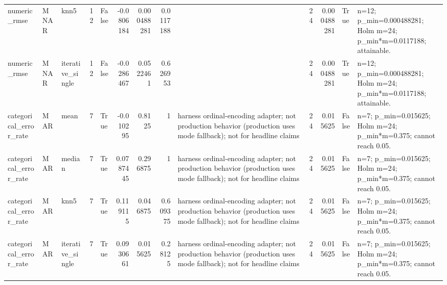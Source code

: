 \begin{table}[ht]
\begin{tabular}{lllrlrrrlrrll}
 numeric\_rmse           & MNAR        & knn5             &           12 & False               &      -0.0806184  & 0.000488281 & 0.0117188 &                                                                                                                    &                             24 &                        0.000488281 & True                        & n=12; p\_min=0.000488281; Holm m=24; p\_min*m=0.0117188; attainable. \\
 numeric\_rmse           & MNAR        & iterative\_single &           12 & False               &      -0.0286467  & 0.0522461   & 0.626953  &                                                                                                                    &                             24 &                        0.000488281 & True                        & n=12; p\_min=0.000488281; Holm m=24; p\_min*m=0.0117188; attainable. \\
 categorical\_error\_rate & MAR         & mean             &            7 & True                &      -0.010295   & 0.8125      & 1         & harness ordinal-encoding adapter; not production behavior (production uses mode fallback); not for headline claims &                             24 &                        0.015625    & False                       & n=7; p\_min=0.015625; Holm m=24; p\_min*m=0.375; cannot reach 0.05.  \\
 categorical\_error\_rate & MAR         & median           &            7 & True                &       0.0787445  & 0.296875    & 1         & harness ordinal-encoding adapter; not production behavior (production uses mode fallback); not for headline claims &                             24 &                        0.015625    & False                       & n=7; p\_min=0.015625; Holm m=24; p\_min*m=0.375; cannot reach 0.05.  \\
 categorical\_error\_rate & MAR         & knn5             &            7 & True                &       0.119115   & 0.046875    & 0.609375  & harness ordinal-encoding adapter; not production behavior (production uses mode fallback); not for headline claims &                             24 &                        0.015625    & False                       & n=7; p\_min=0.015625; Holm m=24; p\_min*m=0.375; cannot reach 0.05.  \\
 categorical\_error\_rate & MAR         & iterative\_single &            7 & True                &       0.0930661  & 0.015625    & 0.28125   & harness ordinal-encoding adapter; not production behavior (production uses mode fallback); not for headline claims &                             24 &                        0.015625    & False                       & n=7; p\_min=0.015625; Holm m=24; p\_min*m=0.375; cannot reach 0.05.  \\

\end{tabular}
\end{table}
